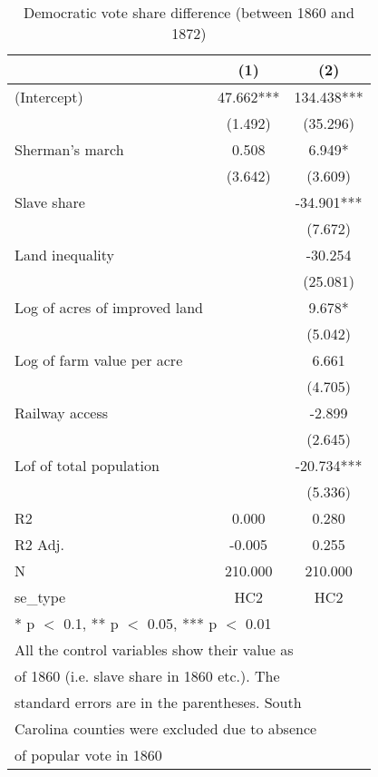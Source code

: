 \begin{table}

\caption{\label{tab:}Democratic vote share difference (between 1860 and 1872)}
\centering
\begin{tabular}[t]{lcc}
\toprule
  & (1) & (2)\\
\midrule
(Intercept) & 47.662*** & 134.438***\\
 & (1.492) & (35.296)\\
Sherman's march & 0.508 & 6.949*\\
 & (3.642) & (3.609)\\
Slave share &  & -34.901***\\
 &  & (7.672)\\
Land inequality &  & -30.254\\
 &  & (25.081)\\
Log of acres of improved land &  & 9.678*\\
 &  & (5.042)\\
Log of farm value per acre &  & 6.661\\
 &  & (4.705)\\
Railway access &  & -2.899\\
 &  & (2.645)\\
Lof of total population &  & -20.734***\\
 &  & (5.336)\\
\midrule
R2 & 0.000 & 0.280\\
R2 Adj. & -0.005 & 0.255\\
N & 210.000 & 210.000\\
se\_type & HC2 & HC2\\
\bottomrule
\multicolumn{3}{l}{\textsuperscript{} * p $<$ 0.1, ** p $<$ 0.05, *** p $<$ 0.01}\\
\multicolumn{3}{l}{\textsuperscript{} All the control variables show their value as}\\
\multicolumn{3}{l}{of 1860 (i.e. slave share in 1860 etc.). The}\\
\multicolumn{3}{l}{standard errors are in the parentheses. South}\\
\multicolumn{3}{l}{Carolina counties were excluded due to absence}\\
\multicolumn{3}{l}{of popular vote in 1860}\\
\end{tabular}
\end{table}
